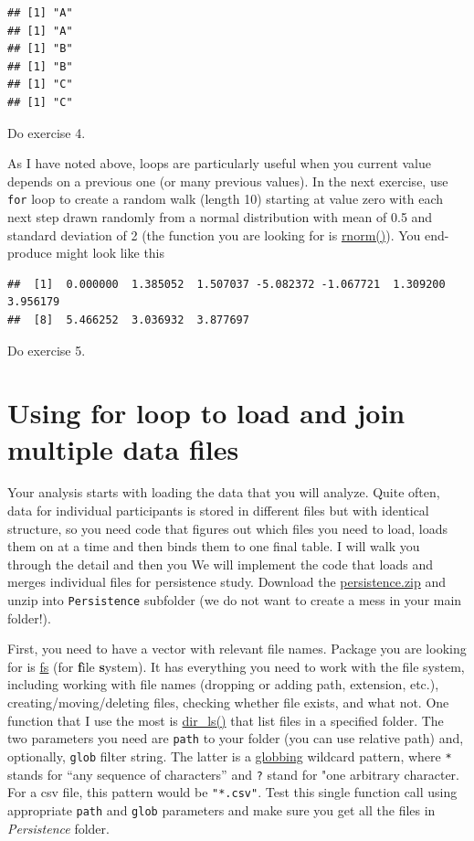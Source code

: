 \documentclass[
]{book}
\begin{document}
\begin{verbatim}
## [1] "A"
## [1] "A"
## [1] "B"
## [1] "B"
## [1] "C"
## [1] "C"
\end{verbatim}

Do exercise 4.

As I have noted above, loops are particularly useful when you current value depends on a previous one (or many previous values). In the next exercise, use \texttt{for} loop to create a random walk (length 10) starting at value zero with each next step drawn randomly from a normal distribution with mean of 0.5 and standard deviation of 2 (the function you are looking for is \href{https://stat.ethz.ch/R-manual/R-devel/library/stats/html/Normal.html}{rnorm()}). You end-produce might look like this

\begin{verbatim}
##  [1]  0.000000  1.385052  1.507037 -5.082372 -1.067721  1.309200  3.956179
##  [8]  5.466252  3.036932  3.877697
\end{verbatim}

Do exercise 5.

\hypertarget{using-for-loop-to-load-and-join-multiple-data-files}{%
\section{Using for loop to load and join multiple data files}\label{using-for-loop-to-load-and-join-multiple-data-files}}

Your analysis starts with loading the data that you will analyze. Quite often, data for individual participants is stored in different files but with identical structure, so you need code that figures out which files you need to load, loads them on at a time and then binds them to one final table. I will walk you through the detail and then you We will implement the code that loads and merges individual files for persistence study. Download the \href{data/persistence.zip}{persistence.zip} and unzip into \texttt{Persistence} subfolder (we do not want to create a mess in your main folder!).

First, you need to have a vector with relevant file names. Package you are looking for is \href{https://github.com/r-lib/fs}{fs} (for \textbf{f}ile \textbf{s}ystem). It has everything you need to work with the file system, including working with file names (dropping or adding path, extension, etc.), creating/moving/deleting files, checking whether file exists, and what not. One function that I use the most is \href{https://www.rdocumentation.org/packages/fs/versions/1.5.0/topics/dir_ls}{dir\_ls()} that list files in a specified folder. The two parameters you need are \texttt{path} to your folder (you can use relative path) and, optionally, \texttt{glob} filter string. The latter is a \href{https://en.wikipedia.org/wiki/Glob_(programming)}{globbing} wildcard pattern, where \texttt{*} stands for ``any sequence of characters'' and \texttt{?} stand for "one arbitrary character. For a csv file, this pattern would be \texttt{"*.csv"}. Test this single function call using appropriate \texttt{path} and \texttt{glob} parameters and make sure you get all the files in \emph{Persistence} folder.
\end{document}
